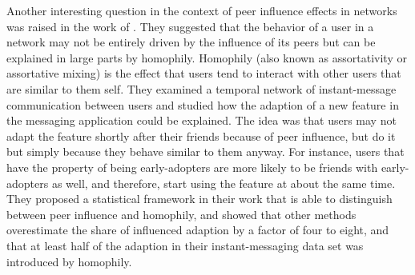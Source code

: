 Another interesting question in the context of peer influence effects in networks was raised in the work of \citet{Aral2009}.
They suggested that the behavior of a user in a network may not be entirely driven by the influence of its peers but can be explained in large parts by homophily.
Homophily (also known as assortativity or assortative mixing) is the effect that users tend to interact with other users that are similar to them self.
They examined a temporal network of instant-message communication between users and studied how the adaption of a new feature in the messaging application could be explained.
The idea was that users may not adapt the feature shortly after their friends because of peer influence, but do it but simply because they behave similar to them anyway.
For instance, users that have the property of being early-adopters are more likely to be friends with early-adopters as well, and therefore, start using the feature at about the same time.
They proposed a statistical framework in their work that is able to distinguish between peer influence and homophily, and showed that other methods overestimate the share of influenced adaption by a factor of four to eight, and that at least half of the adaption in their instant-messaging data set was introduced by homophily.
